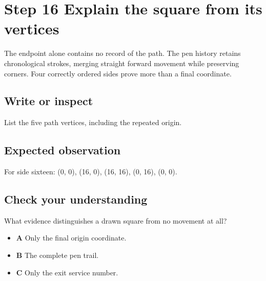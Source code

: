 \section{Step 16 Explain the square from its
  vertices}\label{006-marsbot-square-s16-step-16-explain-the-square-from-its-vertices}

The endpoint alone contains no record of the path. The pen history
retains chronological strokes, merging straight forward movement while
preserving corners. Four correctly ordered sides prove more than a final
coordinate.

\subsection{Write or
  inspect}\label{006-marsbot-square-s16-write-or-inspect}

List the five path vertices, including the repeated origin.

\subsection{Expected
  observation}\label{006-marsbot-square-s16-expected-observation}

For side sixteen: (0, 0), (16, 0), (16, 16), (0, 16), (0, 0).

\subsection{Check your
  understanding}\label{006-marsbot-square-s16-check-your-understanding}

What evidence distinguishes a drawn square from no movement at all?

\begin{itemize}
  \tightlist
  \item
        \textbf{A} Only the final origin coordinate.
  \item
        \textbf{B} The complete pen trail.
  \item
        \textbf{C} Only the exit service number.
\end{itemize}
